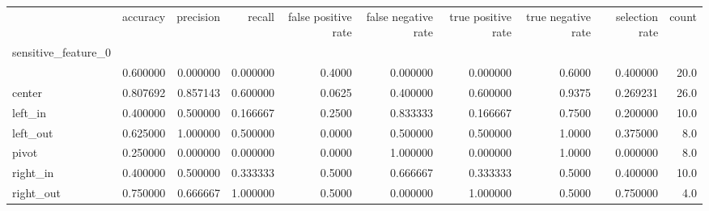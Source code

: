 \begin{tabular}{lrrrrrrrrr}
\toprule
{} &  accuracy &  precision &    recall &  false positive rate &  false negative rate &  true positive rate &  true negative rate &  selection rate &  count \\
sensitive\_feature\_0 &           &            &           &                      &                      &                     &                     &                 &        \\
\midrule
                    &  0.600000 &   0.000000 &  0.000000 &               0.4000 &             0.000000 &            0.000000 &              0.6000 &        0.400000 &   20.0 \\
center              &  0.807692 &   0.857143 &  0.600000 &               0.0625 &             0.400000 &            0.600000 &              0.9375 &        0.269231 &   26.0 \\
left\_in             &  0.400000 &   0.500000 &  0.166667 &               0.2500 &             0.833333 &            0.166667 &              0.7500 &        0.200000 &   10.0 \\
left\_out            &  0.625000 &   1.000000 &  0.500000 &               0.0000 &             0.500000 &            0.500000 &              1.0000 &        0.375000 &    8.0 \\
pivot               &  0.250000 &   0.000000 &  0.000000 &               0.0000 &             1.000000 &            0.000000 &              1.0000 &        0.000000 &    8.0 \\
right\_in            &  0.400000 &   0.500000 &  0.333333 &               0.5000 &             0.666667 &            0.333333 &              0.5000 &        0.400000 &   10.0 \\
right\_out           &  0.750000 &   0.666667 &  1.000000 &               0.5000 &             0.000000 &            1.000000 &              0.5000 &        0.750000 &    4.0 \\
\bottomrule
\end{tabular}
